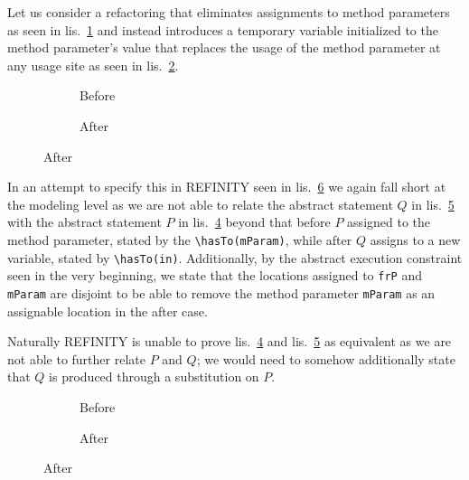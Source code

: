 Let us consider a refactoring that eliminates assignments to method parameters as seen in lis.~\ref{lst:RemoveAssignment-java-before} and instead introduces a temporary variable initialized to the method parameter's value that replaces the usage of the method parameter at any usage site as seen in lis.~\ref{lst:RemoveAssignment-java-after}.

\begin{figure}
  \begin{subfigure}[b]{.45\linewidth}
    
    \caption{Before}
    \label{lst:RemoveAssignment-java-before}
  \end{subfigure}\hfill
  \begin{subfigure}[b]{.45\linewidth}
    
    \caption{After}
    \label{lst:RemoveAssignment-java-after}
  \end{subfigure}
  \label{lst:RemovAssignment-java}
\end{figure}

In an attempt to specify this in REFINITY seen in lis.~\ref{lst:RemovAssignment-refinity} we again fall short at the modeling level as we are not able to relate the abstract statement $Q$ in lis.~\ref{lst:RemoveAssignment-refinity-after} with the abstract statement $P$ in lis.~\ref{lst:RemoveAssignment-refinity-before} beyond that before $P$ assigned to the method parameter, stated by the \lstinline[style=refinity]|\hasTo(mParam)|, while after $Q$ assigns to a new variable, stated by \lstinline[style=refinity]|\hasTo(in)|. Additionally, by the abstract execution constraint seen in the very beginning, we state that the locations
assigned to \lstinline[style=refinity]|frP| and \lstinline[style=refinity]|mParam| are disjoint to be able to remove the method parameter \lstinline[style=refinity]|mParam| as an assignable location in the after case.

Naturally REFINITY is unable to prove lis.~\ref{lst:RemoveAssignment-refinity-before} and lis.~\ref{lst:RemoveAssignment-refinity-after} as equivalent
as we are not able to further relate $P$ and $Q$; we would need to somehow additionally state that $Q$ is produced through a substitution on $P$.

\begin{figure}
  \begin{subfigure}[b]{.45\linewidth}
    
    \caption{Before}
    \label{lst:RemoveAssignment-refinity-before}
  \end{subfigure}\hfill
  \begin{subfigure}[b]{.45\linewidth}
    
    \caption{After}
    \label{lst:RemoveAssignment-refinity-after}
  \end{subfigure}
  \label{lst:RemovAssignment-refinity}
\end{figure}
